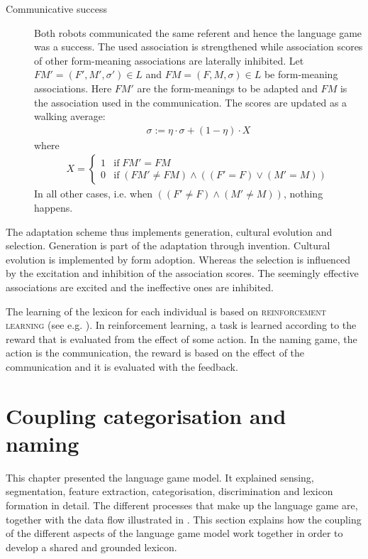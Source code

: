 \begin{description}
\item[Communicative success] Both robots communicated the same referent and hence the language game was a success. The used association is strengthened while association scores of other form-meaning associations are laterally inhibited. Let $FM' = (F',M',\sigma') \in L$ and $FM = (F,M,\sigma) \in L$ be form-meaning associations. Here $FM'$ are the form-meanings to be adapted and $FM$ is the association used in the communication. The scores are updated as a walking average:
\begin{eqnarray}
\sigma := \eta \cdot \sigma + (1 - \eta) \cdot X
\label{e:cm:adapt2}
\end{eqnarray}
where
\begin{eqnarray}
X = \left \{ \begin{array}{rl} 1 & \mbox{if}\; FM' = FM \nonumber\\
0 & \mbox{if}\; (FM' \neq FM) \wedge ((F' = F) \vee (M' = M))\nonumber \end{array} \right.
\end{eqnarray}
In all other cases, i.e. when $((F' \neq F)\wedge (M' \neq M))$, nothing happens.
\end{description}

The adaptation scheme thus implements generation, cultural evolution and selection. Generation is part of the adaptation through invention. Cultural evolution is implemented by form adoption. Whereas the selection is influenced by the excitation and inhibition of the association scores. The seemingly effective associations are excited and the ineffective ones are inhibited.

The learning of the lexicon for each individual is based on  {\scshape reinforcement learning} (see e.g. \citealt{suttonbarto:1998}). In reinforcement learning, a task is learned according to the reward that is evaluated from the effect of some action. In the naming game, the action is the communication, the reward is based on the effect of the communication and it is evaluated with the feedback. 

\section{Coupling categorisation and naming}\label{s:coupling}
This chapter presented the language game model. It explained sensing, segmentation, feature extraction, categorisation, discrimination and lexicon formation in detail. The different processes that make up the language game are, together with the data flow illustrated in . This section explains how the coupling of the different aspects of the language game model work together in order to develop a shared and grounded lexicon.

